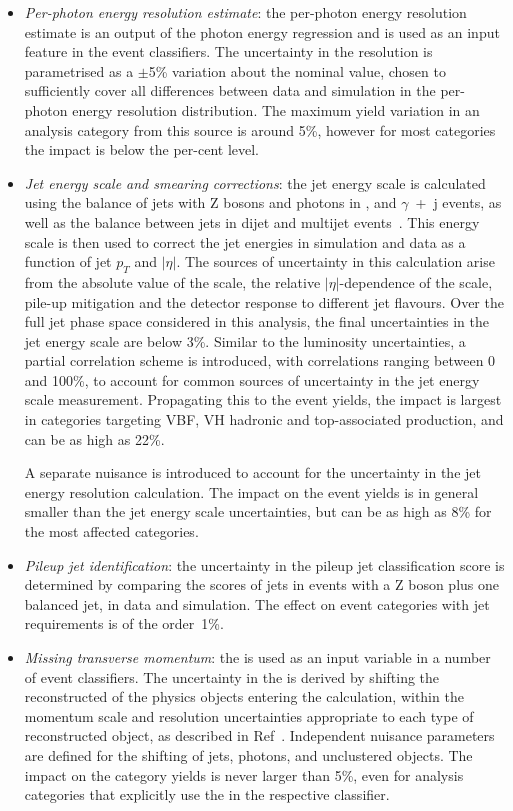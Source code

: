 \begin{itemize}
    \item \textit{Per-photon energy resolution estimate}: the per-photon energy resolution estimate is an output of the photon energy regression and is used as an input feature in the event classifiers. The uncertainty in the resolution is parametrised as a $\pm$5\% variation about the nominal value, chosen to sufficiently cover all differences between data and simulation in the per-photon energy resolution distribution. The maximum yield variation in an analysis category from this source is around 5\%, however for most categories the impact is below the per-cent level. 
    
    \item \textit{Jet energy scale and smearing corrections}: the jet energy scale is calculated using the \pt balance of jets with Z bosons and photons in \Zee, \Zmumu and $\gamma$~+~j events, as well as the \pt balance between jets in dijet and multijet events~\cite{Khachatryan:2016kdb}. This energy scale is then used to correct the jet energies in simulation and data as a function of jet $p_T$ and $|\eta|$. The sources of uncertainty in this calculation arise from the absolute value of the scale, the relative $|\eta|$-dependence of the scale, pile-up mitigation and the detector response to different jet flavours. Over the full jet phase space considered in this analysis, the final uncertainties in the jet energy scale are below 3\%. Similar to the luminosity uncertainties, a partial correlation scheme is introduced, with correlations ranging between 0 and 100\%, to account for common sources of uncertainty in the jet energy scale measurement. Propagating this to the event yields, the impact is largest in categories targeting VBF, VH hadronic and top-associated production, and can be as high as 22\%.
    
    \noindent
    A separate nuisance is introduced to account for the uncertainty in the jet energy resolution calculation. The impact on the event yields is in general smaller than the jet energy scale uncertainties, but can be as high as 8\% for the most affected categories.

    \item \textit{Pileup jet identification}: the uncertainty in the pileup jet classification score is determined by comparing the scores of jets in events with a Z boson plus one balanced jet, in data and simulation. The effect on event categories with jet requirements is of the order~1\%.
    
    \item \textit{Missing transverse momentum}: the \met is used as an input variable in a number of event classifiers. The uncertainty in the \met is derived by shifting the reconstructed \pt of the physics objects entering the \met calculation, within the momentum scale and resolution uncertainties appropriate to each type of reconstructed object, as described in Ref~\cite{}. Independent nuisance parameters are defined for the \pt shifting of jets, photons, and unclustered objects. The impact on the category yields is never larger than 5\%, even for analysis categories that explicitly use the \met in the respective classifier.
    

\end{itemize}
